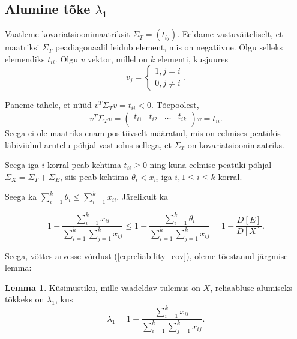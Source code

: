 \documentclass[a4paper,12pt,oneside]{article}
\newcounter{lemma}[section]
\numberwithin{equation}{section}
\theoremstyle{definition}
\newtheorem{lambda_1}[lemma]{Lemma}
\begin{document}
\subsection{Alumine tõke $\lambda_1$}

Vaatleme kovariatsioonimaatriksit $\Sigma_T=(t_{ij})$. Eeldame vastuväiteliselt, et maatriksi $\Sigma_T$ peadiagonaalil leidub element, mis on negatiivne. Olgu selleks elemendiks  $t_{ii}$. Olgu $v$ vektor, millel on $k$ elementi, kusjuures 
\begin{equation*}
v_j =
\begin{cases}
1, j = i \\
0, j \neq i
\end{cases} 
\text{.}
\end{equation*} 

Paneme tähele, et n\"u\"ud $v^T \Sigma_T v = t_{ii} < 0$. Tõepoolest,
\begin{equation*}
v^T \Sigma_T v = 
\begin{pmatrix}
t_{i1} & t_{i2} &  \hdots & t_{ik}\\
\end{pmatrix} v = t_{ii} \text{.}
\end{equation*} Seega ei ole maatriks enam positiivselt määratud, mis on eelmises peatükis läbi\-viidud arutelu põhjal vastuolus sellega, et $\Sigma_T$ on kovariatsioonimaatriks.

Seega iga $i$ korral peab kehtima $t_{ii} \geq 0$ ning kuna eelmise peatüki põhjal $\Sigma_X = \Sigma_T + \Sigma_E$, siis peab kehtima $\theta_i < x_{ii}$ iga $i, 1 \leq i \leq k$ korral.

Seega ka $\sum \limits_{i=1}^k \theta_i \leq \sum \limits_{i=1}^k x_{ii}$. 
Järelikult ka

\begin{equation}
\label{eq:lambda_1}
 1 - \frac{ \sum \limits_{i=1}^k {x}_{ii}}{ \sum \limits_{i=1}^k \sum \limits_{j=1}^k {x}_{ij}} \leq  1 - \frac{ \sum \limits_{i=1}^k  {\theta}_{i}}{ \sum \limits_{i=1}^k \sum \limits_{j=1}^k {x}_{ij}} =  1 - \frac{D \left[ E \right]}{D \left[ X \right]}.
\end{equation} 

Seega, võttes arvesse võrdust (\ref{eq:reliability_cov}), oleme tõestanud järgmise lemma:


\vspace{10pt}


\begin{lambda_1}
Küsimustiku, mille vaadeldav tulemus on $X$, reliaabluse alumiseks tõkkeks on $\lambda_1$, kus
\begin{equation*}
\lambda_1 = 1 - \frac{ \sum \limits_{i=1}^k {x}_{ii}}{ \sum \limits_{i=1}^k \sum \limits_{j=1}^k {x}_{ij}} \text{.}
\end{equation*} 
\end{lambda_1}
\end{document}
